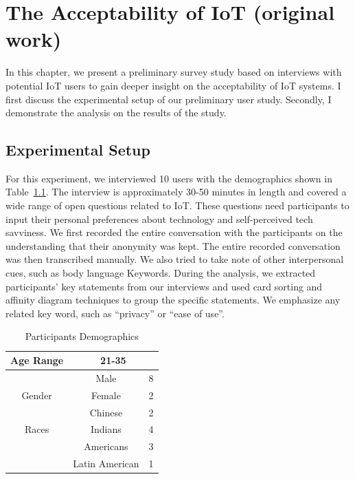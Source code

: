 
\chapter{The Acceptability of IoT (original work)}\label{chapter:acceptability}

In this chapter, we present a preliminary survey study based on interviews with potential IoT users to gain deeper insight on the acceptability of IoT systems. I first discuss the experimental setup of our preliminary user study. Secondly, I demonstrate the analysis on the results of the study.

\section{Experimental Setup}

For this experiment, we interviewed 10 users with the demographics shown in Table~\ref{tab:demographics1}. The interview is approximately 30-50 minutes in length and covered a wide range of open questions related to IoT. These questions need participants to input their personal preferences about technology and self-perceived tech savviness. We first recorded the entire conversation with the participants on the understanding that their anonymity was kept. The entire recorded conversation was then transcribed manually. We also tried to take note of other interpersonal cues, such as body language Keywords. During the analysis, we extracted participants' key statements from our interviews and used card sorting and affinity diagram techniques to group the specific statements. We emphasize any related key word, such as ``privacy'' or ``ease of use''. 

\begin {table}
\caption {Participants Demographics} \label{tab:demographics1}
\vspace{8pt}
\begin{center}
	\begin{tabular}{|c|c|c|}
		\hline
		Age Range & \multicolumn{2}{c|}{ 21-35 }\\
		\hline
		& Male & 8 \\
		\cline{2-3}
		Gender    & Female & 2 \\
		\hline
		& Chinese & 2 \\
		\cline{2-3}
		Races 	  & Indians & 4 \\
		\cline{2-3}
		& Americans & 3 \\
		\cline{2-3}
		& Latin American & 1\\
		\hline
	\end{tabular}
\end{center}
\end {table}


